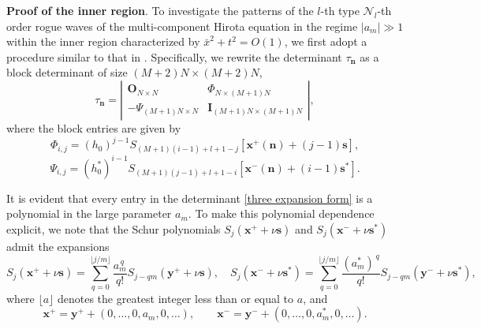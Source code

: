 \documentclass[preprint,3p,10pt]{elsarticle}
\theoremstyle{definition}
\begin{document}
{\bf Proof of the inner region}.
To investigate the patterns of the $l$-th type $\mathcal{N}_l$-th order rogue waves of the multi-component Hirota equation in the regime $|a_m|\gg 1$ within the inner region characterized by $\bar{x}^2+t^2=O(1)$, we first adopt a procedure similar to that in \cite{ohta2012general}. Specifically, we rewrite the determinant $\tau_{\mathbf{n}}$ as a block determinant of size $(M+2)N\times(M+2)N$,
\begin{equation}\label{three expansion form}
\tau_{\mathbf{n}}
=
\left|
\begin{array}{cc}
\mathbf{O}_{N\times N} & \Phi_{N\times (M+1)N} \\
-\Psi_{(M+1)N\times N} & \mathbf{I}_{(M+1)N\times (M+1)N}
\end{array}
\right|,
\end{equation}
where the block entries are given by
\[
\Phi_{i,j}
=
\left(h_0\right)^{j-1}
S_{(M+1)(i-1)+l+1-j}\!\left[\mathbf{x}^{+}(\mathbf{n})+(j-1)\mathbf{s}\right],
\]
\[
\Psi_{i,j}
=
\left(h_0^*\right)^{i-1}
S_{(M+1)(j-1)+l+1-i}\!\left[\mathbf{x}^{-}(\mathbf{n})+(i-1)\mathbf{s}^*\right].
\]

It is evident that every entry in the determinant \eqref{three expansion form} is a polynomial in the large parameter $a_m$. To make this polynomial dependence explicit, we note that the Schur polynomials $S_j(\mathbf{x}^{+}+\nu\mathbf{s})$ and $S_j(\mathbf{x}^{-}+\nu\mathbf{s}^*)$ admit the expansions
\begin{equation}\label{S expand}
S_j\!\left(\mathbf{x}^{+}+\nu \mathbf{s}\right)
=
\sum_{q=0}^{\lfloor j/m \rfloor}
\frac{a_m^{\,q}}{q!}
S_{j-qm}\!\left(\mathbf{y}^{+}+\nu \mathbf{s}\right),
\quad
S_j\!\left(\mathbf{x}^{-}+\nu \mathbf{s}^*\right)
=
\sum_{q=0}^{\lfloor j/m \rfloor}
\frac{(a_m^*)^{\,q}}{q!}
S_{j-qm}\!\left(\mathbf{y}^{-}+\nu \mathbf{s}^*\right),
\end{equation}
where $\lfloor a \rfloor$ denotes the greatest integer less than or equal to $a$, and
\begin{equation}\label{transformation between x and y}
\mathbf{x}^{+}
=
\mathbf{y}^{+}+(0,\ldots,0,a_m,0,\ldots),
\qquad
\mathbf{x}^{-}
=
\mathbf{y}^{-}+(0,\ldots,0,a_m^*,0,\ldots).
\end{equation}
\end{document}

